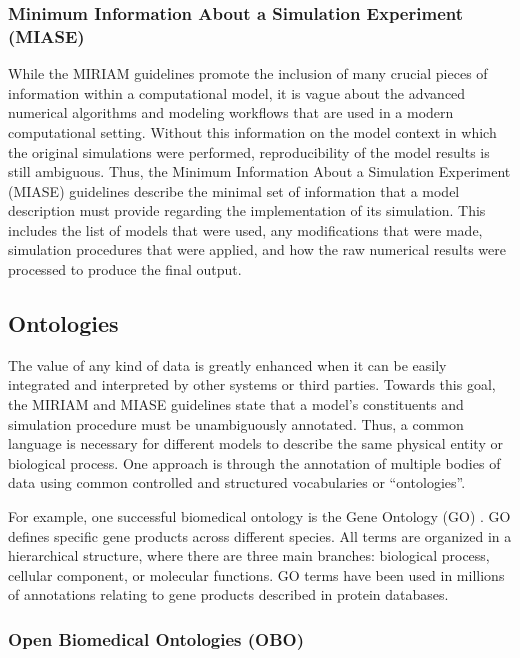 \subsubsection{Minimum Information About a Simulation Experiment
(MIASE)}

While the MIRIAM guidelines promote the inclusion of many crucial pieces
of information within a computational model, it is vague about the
advanced numerical algorithms and modeling workflows that are used in a
modern computational setting. Without this information on the model
context in which the original simulations were performed,
reproducibility of the model results is still ambiguous. Thus, the
Minimum Information About a Simulation Experiment (MIASE) guidelines
\autocite{waltemath2011minimum} describe the minimal set of information
that a model description must provide regarding the implementation of
its simulation. This includes the list of models that were used, any
modifications that were made, simulation procedures that were applied,
and how the raw numerical results were processed to produce the final
output.

\subsection{Ontologies}

The value of any kind of data is greatly enhanced when it can be easily
integrated and interpreted by other systems or third parties. Towards
this goal, the MIRIAM and MIASE guidelines state that a model's
constituents and simulation procedure must be unambiguously annotated.
Thus, a common language is necessary for different models to describe
the same physical entity or biological process. One approach is through
the annotation of multiple bodies of data using common controlled and
structured vocabularies or ``ontologies''.

For example, one successful biomedical ontology is the Gene Ontology
(GO) \autocite{smith2005relations}. GO defines specific gene products
across different species. All terms are organized in a hierarchical
structure, where there are three main branches: biological process,
cellular component, or molecular functions. GO terms have been used in
millions of annotations relating to gene products described in protein
databases.

\subsubsection{Open Biomedical Ontologies (OBO)}

